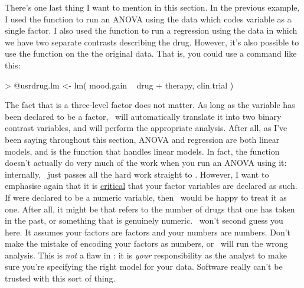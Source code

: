 There's one last thing I want to mention in this section. In the previous example, I  used the  function to run an ANOVA using the  data which codes  variable as a single factor. I also used the  function to run a regression using the  data in which we have two separate contrasts describing the drug. However, it's also possible to use the  function on the the original data. That is, you could use a command like this:
\begin{rblock1}
> @usr{drug.lm <- lm( mood.gain ~ drug + therapy, clin.trial )}
\end{rblock1}
The fact that  is a three-level factor does not matter. As long as the  variable has been declared to be a factor, \R\ will automatically translate it into two binary contrast variables, and will perform the appropriate analysis. After all, as I've been saying throughout this section, ANOVA and regression are both linear models, and  is the function that handles linear models. In fact, the  function doesn't actually do very much of the work when you run an ANOVA using it: internally, \R\ just passes all the hard work straight to . However, I want to emphasise again that it is \underline{critical} that your factor variables are declared as such. If  were declared to be a numeric variable, then \R\ would be happy to treat it as one. After all, it might be that  refers to the number of drugs that one has taken in the past, or something that is genuinely numeric. \R\ won't second guess you here. It assumes your factors are factors and your numbers are numbers. Don't make the mistake of encoding your factors as numbers, or \R\ will run the wrong analysis. This is {\it not} a flaw in \R: it is {\it your} responsibility as the analyst to make sure you're specifying the right model for your data. Software really can't be trusted with this sort of thing. 

